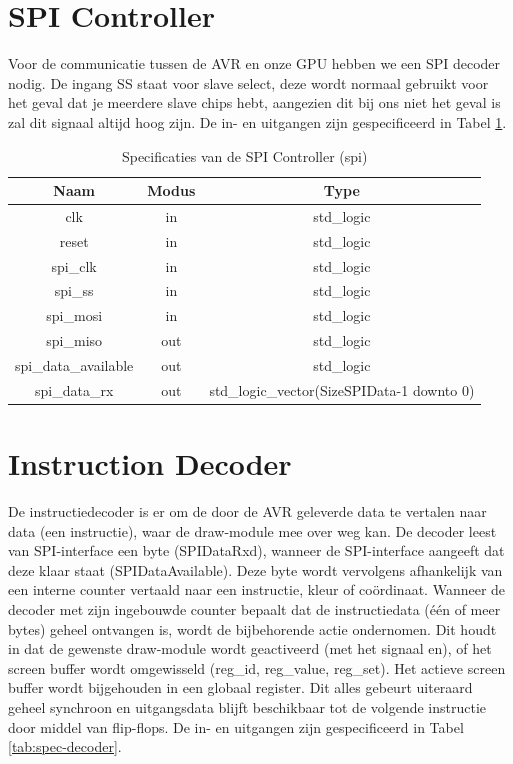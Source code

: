 \documentclass{scrreprt} %
\begin{document}
\section{SPI Controller}
Voor de communicatie tussen de AVR en onze GPU hebben we een SPI decoder nodig.
De ingang SS staat voor slave select, deze wordt normaal gebruikt voor het geval dat je meerdere slave chips hebt, aangezien dit bij ons niet het geval is zal dit signaal altijd hoog zijn.
De in- en uitgangen zijn gespecificeerd in Tabel \ref{tab:spec-spi}.

\begin{table}[H]
\centering
\caption{Specificaties van de SPI Controller (spi)}
\label{tab:spec-spi}
\begin{tabular}{c c c}
	\hline\hline
 	Naam & Modus & Type\\
 	\hline
	clk & in & std\_logic \\
	reset & in & std\_logic \\
	spi\_clk & in & std\_logic \\
	spi\_ss & in & std\_logic \\
	spi\_mosi & in & std\_logic \\
	spi\_miso & out & std\_logic \\
	spi\_data\_available & out & std\_logic \\
	spi\_data\_rx & out & std\_logic\_vector(SizeSPIData-1 downto 0) \\
  	\hline
\end{tabular}
\end{table}

\section{Instruction Decoder}
De instructiedecoder is er om de door de AVR geleverde data te vertalen naar data (een instructie), waar de draw-module mee over weg kan.
De decoder leest van SPI-interface een byte (SPIDataRxd), wanneer de SPI-interface aangeeft dat deze klaar staat (SPIDataAvailable).
Deze byte wordt vervolgens afhankelijk van een interne counter vertaald naar een instructie, kleur of coördinaat.
Wanneer de decoder met zijn ingebouwde counter bepaalt dat de instructiedata (één of meer bytes) geheel ontvangen is, wordt de bijbehorende actie ondernomen.
Dit houdt in dat de gewenste draw-module wordt geactiveerd (met het signaal en), of het screen buffer wordt omgewisseld (reg\_id, reg\_value, reg\_set).
Het actieve screen buffer wordt bijgehouden in een globaal register.
Dit alles gebeurt uiteraard geheel synchroon en uitgangsdata blijft beschikbaar tot de volgende instructie door middel van flip-flops.
De in- en uitgangen zijn gespecificeerd in Tabel \ref{tab:spec-decoder}.
\end{document}
